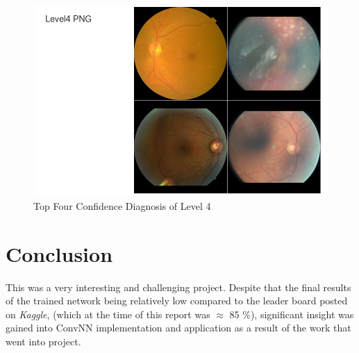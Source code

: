 \documentclass[letterpaper,12pt]{article}
\begin{document}
\begin{figure}[htbp]
\begin{center}
\includegraphics[scale=0.5]{images/Level4_Top4.png}
\caption{Top Four Confidence Diagnosis of Level 4}
\label{DR4}
\end{center}
\end{figure}

\newpage
\section{Conclusion}

This was a very interesting and challenging project. Despite that the final results of the trained network being relatively low compared to the leader board posted on \textit{Kaggle}, (which at the time of this report was $\approx$ 85 $\%$), significant insight was gained into ConvNN implementation and application as a result of the work that went into project.

\newpage


\end{document}
